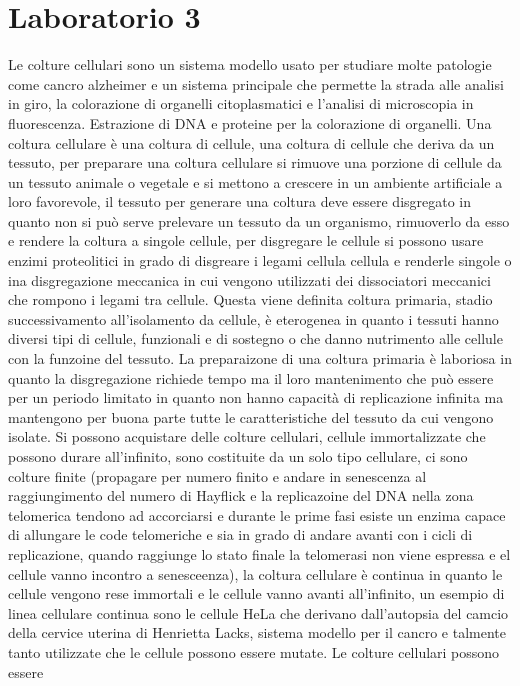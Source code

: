 \section{Laboratorio 3}
Le colture cellulari sono un sistema modello usato per studiare molte patologie come cancro alzheimer e un sistema principale che permette la strada alle analisi in giro, la colorazione
di organelli citoplasmatici e l'analisi di microscopia in fluorescenza. Estrazione di DNA e proteine per la colorazione di organelli. Una coltura cellulare \`e una coltura di cellule, 
una coltura di cellule che deriva da un tessuto, per preparare una coltura cellulare si rimuove una porzione di cellule da un tessuto animale o vegetale e si mettono a crescere in
un ambiente artificiale a loro favorevole, il tessuto per generare una coltura deve essere disgregato in quanto non si pu\`o serve prelevare un tessuto da un organismo, rimuoverlo da
esso e rendere la coltura a singole cellule, per disgregare le cellule si possono usare enzimi proteolitici in grado di disgreare i legami cellula cellula e renderle singole o ina
disgregazione meccanica in cui vengono utilizzati dei dissociatori meccanici che rompono i legami tra cellule. Questa viene definita coltura primaria, stadio successivamento 
all'isolamento da cellule, \`e eterogenea in quanto i tessuti hanno diversi tipi di cellule, funzionali e di sostegno o che danno nutrimento alle cellule con la funzoine del tessuto. 
La preparaizone di una coltura primaria \`e laboriosa in quanto la disgregazione richiede tempo ma il loro mantenimento che pu\`o essere per un periodo limitato in quanto non hanno
capacit\`a di replicazione infinita ma mantengono per buona parte tutte le caratteristiche del tessuto da cui vengono isolate. Si possono acquistare delle colture cellulari, cellule
immortalizzate che possono durare all'infinito, sono costituite da un solo tipo cellulare, ci sono colture finite (propagare per numero finito e andare in senescenza al raggiungimento
del numero di Hayflick e la replicazoine del DNA nella zona telomerica tendono ad accorciarsi e durante le prime fasi esiste un enzima capace di allungare le code telomeriche e sia in
grado di andare avanti con i cicli di replicazione, quando raggiunge lo stato finale la telomerasi non viene espressa e el cellule vanno incontro a senesceenza), la coltura cellulare \`e
continua in quanto le cellule vengono rese immortali e le cellule vanno avanti all'infinito, un esempio di linea cellulare continua sono le cellule HeLa che derivano dall'autopsia
del camcio della cervice uterina di Henrietta Lacks, sistema modello per il cancro e talmente tanto utilizzate che le cellule possono essere mutate. Le colture cellulari possono essere
